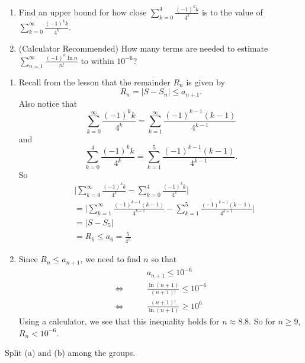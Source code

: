 \documentclass[handout]{ximera}
\begin{document}
\begin{problem}
\begin{enumerate}

\item  Find an upper bound for how close $\sum_{k=0}^4 \frac{(-1)^k k}{4^k}$ is to the value of $\sum_{k=0}^\infty \frac{(-1)^k k}{4^k}$.

\item  (Calculator Recommended) How many terms are needed to estimate $\sum_{n=1}^\infty \frac{(-1)^n \ln n}{n!}$ to within $10^{-6}$?

\end{enumerate}
	\begin{freeResponse}
	\begin{enumerate}

	\item  Recall from the lesson that the remainder $R_n$ is given by
		\[
		R_n = |S - S_n| \leq a_{n+1}.
		\]
	Also notice that
		\[
		\sum_{k=0}^\infty \frac{(-1)^k k}{4^k} = \sum_{k=1}^\infty \frac{(-1)^{k-1} (k-1)}{4^{k-1}}
		\]
	and
		\[
		\sum_{k=0}^4 \frac{(-1)^k k}{4^k} = \sum_{k=1}^5 \frac{(-1)^{k-1} (k-1)}{4^{k-1}}.
		\]
	So
		\begin{align*}
		&\biggr| \sum_{k=0}^\infty \frac{(-1)^k k}{4^k} - \sum_{k=0}^4 \frac{(-1)^k k}{4^k} \biggr|  \\
		&= \biggr| \sum_{k=1}^\infty \frac{(-1)^{k-1} (k-1)}{4^{k-1}} - \sum_{k=1}^5 \frac{(-1)^{k-1} (k-1)}{4^{k-1}} \biggr|  \\
		&= | S - S_5 |  \\
		&= R_6 \leq a_6 = \boxed{\frac{5}{4^5}}
		\end{align*}

	\item  Since $R_n \leq a_{n+1}$, we need to find $n$ so that 
		\begin{align*}
		&a_{n+1} \leq 10^{-6}  \\
		\Longleftrightarrow 	\qquad	&\frac{\ln (n+1)}{(n+1)!} \leq 10^{-6}  \\
		\Longleftrightarrow 	\qquad	&\frac{(n+1)!}{\ln (n+1)} \geq 10^6 
		\end{align*}
	Using a calculator, we see that this inequality holds for $n \approx 8.8$.  
	So for $\boxed{n \geq 9}$, $R_n < 10^{-6}$.  

	\end{enumerate}
	\end{freeResponse}
		
\end{problem}

\begin{instructorNotes}
Split (a) and (b) among the groups.
\end{instructorNotes}









	
	
	
	
	
	
	
	
	

	










								
				
				
	
\end{document}
